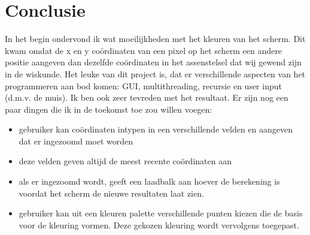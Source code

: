 \documentclass[hidelinks, dutch]{article}
\begin{document}
\section{Conclusie}
In het begin ondervond ik wat moeilijkheden met het kleuren van het scherm. Dit kwam omdat de x en y coördinaten van een pixel op het scherm een andere positie aangeven dan dezelfde coördinaten in het assenstelsel dat wij gewend zijn in de wiskunde. Het leuke van dit project is, dat er verschillende aspecten van het programmeren aan bod komen: GUI, multithreading, recursie en user input (d.m.v. de muis). Ik ben ook zeer tevreden met het resultaat. Er zijn nog een paar dingen die ik in de toekomst toe zou willen voegen:
\begin{itemize}
	\item gebruiker kan coördinaten intypen in een verschillende velden en aangeven dat er ingezoomd moet worden
	\item deze velden geven altijd de meest recente coördinaten aan
	\item als er ingezoomd wordt, geeft een laadbalk aan hoever de berekening is voordat het scherm de nieuwe
	resultaten laat zien.
	\item gebruiker kan uit een kleuren palette verschillende punten kiezen die de basis voor de kleuring vormen. Deze gekozen kleuring wordt vervolgens toegepast.
\end{itemize}
\end{document}
